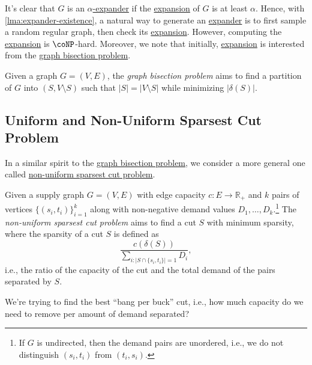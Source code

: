 It's clear that \(G\) is an \hyperref[def:expander]{\(\alpha \)-expander} if the \hyperref[def:expansion]{expansion} of \(G\) is at least \(\alpha \). Hence, with \autoref{lma:expander-existence}, a natural way to generate an \hyperref[def:expander]{expander} is to first sample a random regular graph, then check its \hyperref[def:expansion]{expansion}. However, computing the \hyperref[def:expansion]{expansion} is \(\coNP\)-hard. Moreover, we note that initially, \hyperref[def:expansion]{expansion} is interested from the \hyperref[prb:graph-bisection]{graph bisection problem}.

\begin{problem}\label{prb:graph-bisection}
Given a graph \(G = (V, E)\), the \emph{graph bisection problem} aims to find a partition of \(G\) into \((S, V \setminus S)\) such that \(\lvert S \rvert = \lvert V \setminus S \rvert \) while minimizing \(\lvert \delta (S) \rvert \).
\end{problem}

\subsection{Uniform and Non-Uniform Sparsest Cut Problem}
In a similar spirit to the \hyperref[prb:graph-bisection]{graph bisection problem}, we consider a more general one called \hyperref[prb:non-uniform-sparsest-cut]{non-uniform sparsest cut problem}.

\begin{problem}\label{prb:non-uniform-sparsest-cut}
Given a supply graph \(G = (V, E)\) with edge capacity \(c \colon E \to \mathbb{R} _+\) and \(k\) pairs of vertices \(\{ (s_i, t_i) \} _{i=1}^{k}\) along with non-negative demand values \(D_1, \dots , D_k\).\footnote{If \(G\) is undirected, then the demand pairs are unordered, i.e., we do not distinguish \((s_i, t_i)\) from \((t_i, s_i)\).} The \emph{non-uniform sparsest cut problem} aims to find a cut \(S\) with minimum sparsity, where the sparsity of a cut \(S\) is defined as
\[
	\frac{c(\delta (S))}{\sum_{i \colon \lvert S \cap \{ s_i, t_i \} \rvert = 1} D_i},
\]
i.e., the ratio of the capacity of the cut and the total demand of the pairs separated by \(S\).
\end{problem}

\begin{intuition}
	We're trying to find the best ``bang per buck''	cut, i.e., how much capacity do we need to remove per amount of demand separated?
\end{intuition}

